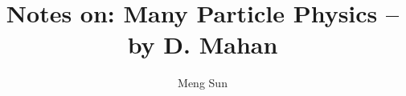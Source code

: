 \documentclass{tufte-book}
\title{Notes on: Many Particle Physics --by D. Mahan}
\author{Meng Sun}
\begin{document}
\maketitle
\tableofcontents








{}

\end{document}
